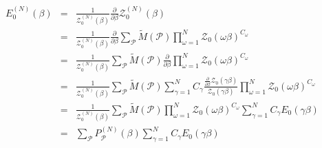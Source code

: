 \documentclass[aps,preprint,showpacs,superscriptaddress,groupedaddress]{revtex4}  %
\begin{document}
\begin{eqnarray}
  E_{0}^{(N)}(\beta) &=& \frac{1}{\mathcal{Z}_{0}^{(N)}(\beta)} \frac{\partial}{\partial\beta} \mathcal{Z}_{0}^{(N)}(\beta) \\
                     &=& \frac{1}{\mathcal{Z}_{0}^{(N)}(\beta)} \frac{\partial}{\partial\beta} \sum_{\mathcal{P}} \tilde{M}(\mathcal{P}) \prod_{\omega=1}^{N} \mathcal{Z}_{0}(\omega\beta)^{C_{\omega}} \\
                     &=& \frac{1}{\mathcal{Z}_{0}^{(N)}(\beta)} \sum_{\mathcal{P}} \tilde{M}(\mathcal{P}) \frac{\partial}{\partial\beta} \prod_{\omega=1}^{N} \mathcal{Z}_{0}(\omega\beta)^{C_{\omega}} \\
                     &=& \frac{1}{\mathcal{Z}_{0}^{(N)}(\beta)} \sum_{\mathcal{P}} \tilde{M}(\mathcal{P}) \sum_{\gamma=1}^{N} C_{\gamma} \frac{\frac{\partial}{\partial\beta}\mathcal{Z}_{0}(\gamma\beta)}{\mathcal{Z}_{0}(\gamma\beta)} \prod_{\omega=1}^{N} \mathcal{Z}_{0}(\omega\beta)^{C_{\omega}} \\
                     &=& \frac{1}{\mathcal{Z}_{0}^{(N)}(\beta)} \sum_{\mathcal{P}} \tilde{M}(\mathcal{P}) \prod_{\omega=1}^{N} \mathcal{Z}_{0}(\omega\beta)^{C_{\omega}} \sum_{\gamma=1}^{N} C_{\gamma} E_{0}(\gamma\beta) \\
                     &=& \sum_{\mathcal{P}} P_{\mathcal{P}}^{(N)}(\beta) \sum_{\gamma=1}^{N} C_{\gamma} E_{0}(\gamma\beta)
\end{eqnarray}

{}

%
\end{document}
